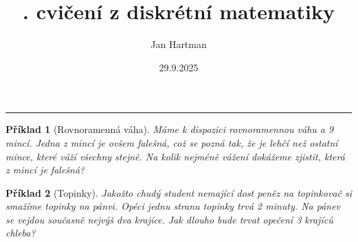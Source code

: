\documentclass[10pt]{article}
\title{\tutnum. cvičení z diskrétní matematiky}
\author{Jan Hartman}
\date{29.9.2025}
\newcommand{\titlerule}{%
    \noindent %
    \makebox[\textwidth]{\large \thetitle \hfill \thedate}
    \rule{\textwidth}{0.4pt}%
}
\theoremstyle{problemstyle}
\newtheorem{problem}{Příklad}
\begin{document}
\titlerule

\begin{problem}[Rovnoramenná váha]
Máme k dispozici rovnoramennou váhu a 9 mincí. Jedna z mincí je ovšem falešná, což se pozná tak, že je lehčí než ostatní mince, které váží všechny stejně. Na kolik nejméně vážení dokážeme zjistit, která z mincí je falešná?
\end{problem}

\begin{problem}[Topinky]
Jakožto chudý student nemající dost peněz na topinkovač si smažíme topinky na pánvi. Opéci jednu stranu topinky trvá 2 minuty. Na pánev se vejdou současně nejvýš dva krajíce. Jak dlouho bude trvat opečení 3 krajíců chleba?
\end{problem}
\end{document}
